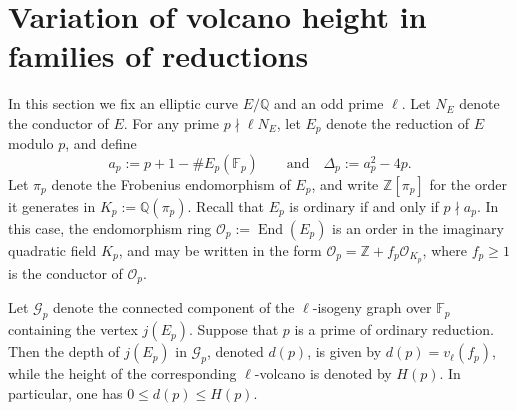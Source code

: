 \documentclass[table]{amsart}
\newcommand{\Z}{\mathbb{Z}}
\newcommand{\Q}{\mathbb{Q}}
\newcommand{\F}{\mathbb{F}}
\newcommand{\cO}{\mathcal{O}}
\newcommand{\op}[1]{\operatorname{#1}}
\numberwithin{equation}{section}
\begin{document}
\section{Variation of volcano height in families of reductions}\label{s3}
In this section we fix an elliptic curve $E/\Q$ and an odd prime $\ell$. Let $N_E$ denote the conductor of $E$. For any prime $p\nmid \ell N_E$, let $E_p$ denote the reduction of $E$ modulo $p$, and define
\[
a_p := p+1-\#E_p(\F_p) \qquad \text{and}\quad \Delta_p := a_p^2-4p.
\]
Let $\pi_p$ denote the Frobenius endomorphism of $E_p$, and write $\Z[\pi_p]$ for the order it generates in $K_p:=\Q(\pi_p)$. Recall that $E_p$ is ordinary if and only if $p\nmid a_p$. In this case, the endomorphism ring $\cO_p := \op{End}(E_p)$
is an order in the imaginary quadratic field $K_p$, and may be written in the form $\cO_p = \Z + f_p \cO_{K_p}$, where $f_p\ge 1$ is the conductor of $\cO_p$.

Let $\mathcal{G}_p$ denote the connected component of the $\ell$-isogeny graph over $\F_p$ containing the vertex $j(E_p)$. Suppose that $p$ is a prime of ordinary reduction. Then the depth of $j(E_p)$ in $\mathcal{G}_p$, denoted $d(p)$, is given by $d(p)=v_\ell(f_p)$, while the height of the corresponding $\ell$-volcano is denoted by $H(p)$. In particular, one has $0 \le d(p) \le H(p)$.
\end{document}

